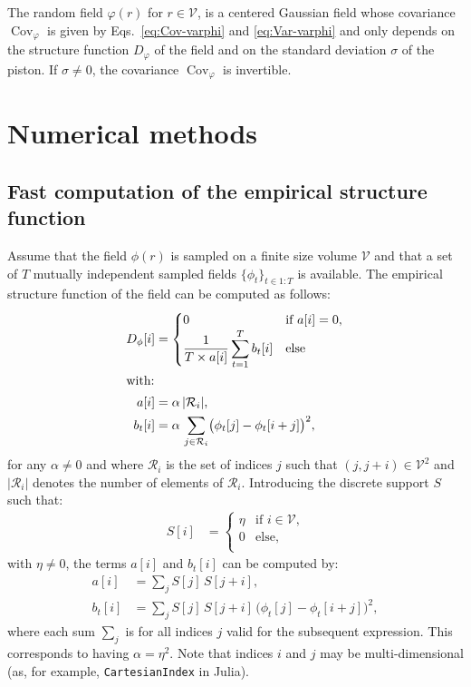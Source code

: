 \documentclass{article}
\DeclareMathOperator{\Cov}{Cov}
\begin{document}
The random field $\varphi(r)$ for $r \in \mathcal{V}$, is a centered Gaussian
field whose covariance $\Cov_{\varphi}$ is given by Eqs.~\eqref{eq:Cov-varphi}
and \eqref{eq:Var-varphi} and only depends on the structure function
$D_{\varphi}$ of the field and on the standard deviation $\sigma$ of the
piston. If $\sigma \not= 0$, the covariance $\Cov_{\varphi}$ is invertible.


\section{Numerical methods}

\subsection{Fast computation of the empirical structure function}

Assume that the field $\phi(r)$ is sampled on a finite size volume
$\mathcal{V}$ and that a set of $T$ mutually independent sampled fields
$\{\phi_{t}\}_{t \in 1:T}$ is available. The empirical structure function
of the field can be computed as follows:
\begin{align}
  D_{\phi}[i]
  &= \begin{cases}
       0 & \text{if $a[i] = 0$,}\\
       \displaystyle \frac{1}{T \times a[i]}
       \sum_{t=1}^{T} b_{t}[i] & \text{else}\\
     \end{cases}\\
  \intertext{with:}
  a[i] &= \alpha\,|\mathcal{R}_i|, \\
  b_{t}[i] &= \alpha\,\sum_{j \in \mathcal{R}_i}
             \bigl(\phi_{t}[j] - \phi_{t}[i+j]\bigr)^{2},
\end{align}
for any $\alpha \not= 0$ and where $\mathcal{R}_i$ is the set of indices $j$
such that $(j,j+i)\in\mathcal{V}^{2}$ and $|\mathcal{R}_i|$ denotes the number
of elements of $\mathcal{R}_i$. Introducing the discrete support $S$ such that:
\begin{align}
  S[i]
  &= \begin{cases}
       \eta & \text{if $i \in \mathcal{V}$,}\\
       0 & \text{else,}\\
     \end{cases}
\end{align}
with $\eta \not= 0$, the terms $a[i]$ and $b_{t}[i]$ can be computed by:
\begin{align}
  \label{eq:naive_a}
  a[i] &= \sum\nolimits_{j} S[j]\,S[j+i],\\
  \label{eq:naive_b}
  b_{t}[i] &= \sum\nolimits_{j} S[j]\,S[j+i]\,
             \bigl(\phi_{t}[j] - \phi_{t}[i+j]\bigr)^{2},
\end{align}
where each sum $\sum\nolimits_{j}$ is for all indices $j$ valid for the
subsequent expression. This corresponds to having $\alpha = \eta^{2}$.
Note that indices $i$ and $j$ may be multi-dimensional (as, for example,
\texttt{CartesianIndex} in Julia).
\end{document}

